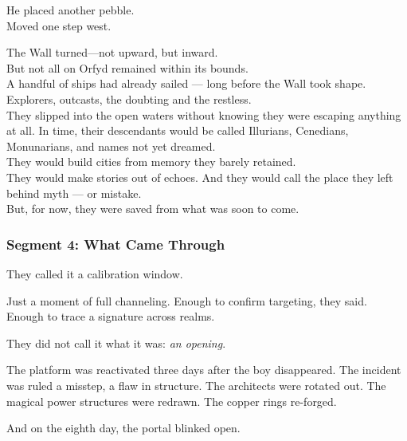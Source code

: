 \documentclass[9pt]{article}
\begin{document}
\vspace{0.5em}
He placed another pebble.\\
Moved one step west.

\vspace{0.5em}
The Wall turned---not upward, but inward.\\

But not all on Orfyd remained within its bounds.\\

A handful of ships had already sailed — long before the Wall took shape.\\

Explorers, outcasts, the doubting and the restless.\\

They slipped into the open waters without knowing they were escaping anything at all.
In time, their descendants would be called Illurians, Cenedians, Monunarians, and names not yet dreamed.\\

They would build cities from memory they barely retained.\\

They would make stories out of echoes.
And they would call the place they left behind myth — or mistake.\\

But, for now, they were saved from what was soon to come.

\newpage

\subsubsection*{Segment 4: What Came Through}

They called it a calibration window.

\vspace{0.5em}
Just a moment of full channeling. Enough to confirm targeting, they said. Enough to trace a signature across realms.

\vspace{0.5em}
They did not call it what it was: \textit{an opening}.

\vspace{0.5em}
The platform was reactivated three days after the boy disappeared. The incident was ruled a misstep, a flaw in structure. The architects were rotated out. The magical power structures were redrawn. The copper rings re-forged.

\vspace{0.5em}
And on the eighth day, the portal blinked open.
\end{document}
